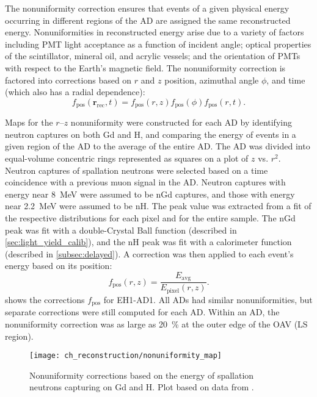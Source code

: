 The nonuniformity correction ensures that events of a given physical energy
occurring in different regions of the AD
are assigned the same reconstructed energy.
Nonuniformities in reconstructed energy arise due to a variety of factors
including PMT light acceptance as a function of incident angle;
optical properties of the scintillator, mineral oil, and acrylic vessels;
and the orientation of PMTs with respect to the Earth's magnetic field.
The nonuniformity correction is factored into corrections based on
$r$ and $z$ position, azimuthal angle $\phi$, and time
(which also has a radial dependence):
\begin{equation}
    f_{\text{pos}}(\textbf{r}_{\text{rec}},t) =
    f_{\text{pos}}(r, z)f_{\text{pos}}(\phi)f_{\text{pos}}(r, t).
\end{equation}

Maps for the $r$--$z$ nonuniformity were constructed for each AD
by identifying neutron captures on both Gd and H,
and comparing the energy of events in a given region of the AD
to the average of the entire AD.
The AD was divided into equal-volume concentric rings
represented as squares on a plot of $z$ vs. $r^2$.
Neutron captures of spallation neutrons were selected
based on a time coincidence with a previous muon signal in the AD.
Neutron captures with energy near \SI{8}{\MeV} were assumed to be nGd captures,
and those with energy near \SI{2.2}{\MeV} were assumed to be nH.
The peak value was extracted from a fit of the respective distributions
for each pixel and for the entire sample.
The nGd peak was fit with a double-Crystal Ball function \cite{cbfunction}
(described in \cref{sec:light_yield_calib}),
and the nH peak was fit with a calorimeter function \cite{calorimeter2016}
(described in \cref{subsec:delayed}).
A correction was then applied to each event's energy based on its position:
\begin{equation}
    f_{\text{pos}}(r, z) = \frac{E_{\text{avg}}}{E_{\text{pixel}}(r,z)}.
\end{equation}
 shows the corrections $f_{\text{pos}}$ for EH1-AD1.
All ADs had similar nonuniformities, but separate corrections were still computed
for each AD.
Within an AD, the nonuniformity correction was as large as \SI{20}{\percent}
at the outer edge of the OAV (LS region).

\begin{figure}
    \centering
    \texttt{[image: ch\_reconstruction/nonuniformity\_map]}
    \caption{
        Nonuniformity corrections based on the energy of spallation neutrons
        capturing on Gd and H.
        Plot based on data from \cite{nonuniformity2}.
    }
    \label{fig:nonuniformity_map}
\end{figure}

